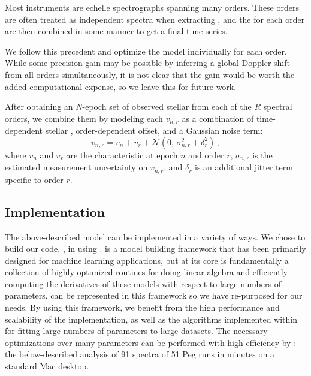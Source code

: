 \documentclass[modern]{aastex62}
\begin{document}
{Most \EPRV instruments are echelle spectrographs spanning many orders. 
These orders are often treated as independent spectra when extracting \RVs, and the \RVs for each order are then combined in some manner to get a final time series. 

We follow this precedent and optimize the \wobble model individually for each order. 
While some \RV precision gain may be possible by inferring a global Doppler shift from all orders simultaneously, it is not clear that the gain would be worth the added computational expense, so we leave this for future work. 

After obtaining an $N$-epoch set of observed stellar \RVs from each of the $R$ spectral orders, we combine them by modeling each \RV $v_{n,r}$ as a combination of time-dependent stellar \RV, order-dependent \RV offset, and a Gaussian noise term:
\begin{equation}
v_{n,r} = v_n + v_r + \mathcal{N}(0,\,\sigma_{n,r}^{2} + \delta_r^2 )\,,
\end{equation}
where $v_n$ and $v_r$ are the characteristic \RVs at epoch $n$ and order $r$, $\sigma_{n,r}$ is the estimated measurement uncertainty on $v_{n,r}$, and $\delta_r$ is an additional jitter term specific to order $r$. 


\subsection{Implementation}
\label{s:implementation}

The above-described model can be implemented in a variety of ways. We chose to build our code, \wobble, in  using \TF. 
\TF is a model building framework that has been primarily designed for machine
learning applications, but at its core \TF is fundamentally a collection of
highly optimized routines for doing linear algebra and efficiently computing the
derivatives of these models with respect to large numbers of parameters.
\wobble can be represented in this framework so we have re-purposed \TF for our
needs.
By using this framework, we benefit from the high performance and scalability
of the implementation, as well as the algorithms implemented within \TF for
fitting large numbers of parameters to large datasets.
The necessary optimizations over many parameters can be performed with high efficiency by \TF: the below-described analysis of 91 spectra of 51 Peg runs in  minutes on a standard Mac desktop.

}
\end{document}

